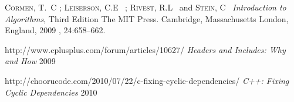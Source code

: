 \documentclass[12pt]{article} %
\begin{document}

\begin{thebibliography}{99} %

 \textsc{Cormen, T.~C ; Leiserson, C.E~ ; Rivest, R.L~ } and \textsc{Stein, C~}
\textit{Introduction to Algorithms}, Third Edition
The MIT Press. Cambridge, Massachusetts	London, England, 2009
, 24:658--662.

http://www.cplusplus.com/forum/articles/10627/
\textit{Headers and Includes: Why and How} 2009

http://choorucode.com/2010/07/22/c-fixing-cyclic-dependencies/
\textit{C++: Fixing Cyclic Dependencies} 2010

\end{thebibliography}

\end{document}
